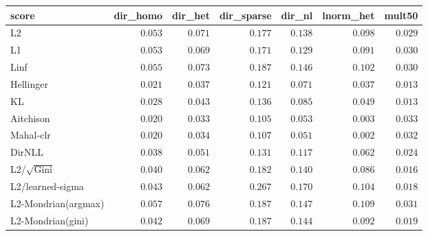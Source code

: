 \begin{tabular}{lrrrrrr}
\toprule
score & dir\_homo & dir\_het & dir\_sparse & dir\_nl & lnorm\_het & mult50 \\
\midrule
L2 & $0.053$ & $0.071$ & $0.177$ & $0.138$ & $0.098$ & $0.029$ \\
L1 & $0.053$ & $0.069$ & $0.171$ & $0.129$ & $0.091$ & $0.030$ \\
Linf & $0.055$ & $0.073$ & $0.187$ & $0.146$ & $0.102$ & $0.030$ \\
Hellinger & $0.021$ & $0.037$ & $0.121$ & $0.071$ & $0.037$ & $0.013$ \\
KL & $0.028$ & $0.043$ & $0.136$ & $0.085$ & $0.049$ & $\mathbf{0.013}$ \\
Aitchison & $0.020$ & $\mathbf{0.033}$ & $\mathbf{0.105}$ & $0.053$ & $0.003$ & $0.033$ \\
Mahal-clr & $\mathbf{0.020}$ & $0.034$ & $0.107$ & $\mathbf{0.051}$ & $\mathbf{0.002}$ & $0.032$ \\
DirNLL & $0.038$ & $0.051$ & $0.131$ & $0.117$ & $0.062$ & $0.024$ \\
L2/$\sqrt{\mathrm{Gini}}$ & $0.040$ & $0.062$ & $0.182$ & $0.140$ & $0.086$ & $0.016$ \\
L2/learned-sigma & $0.043$ & $0.062$ & $0.267$ & $0.170$ & $0.104$ & $0.018$ \\
L2-Mondrian(argmax) & $0.057$ & $0.076$ & $0.187$ & $0.147$ & $0.109$ & $0.031$ \\
L2-Mondrian(gini) & $0.042$ & $0.069$ & $0.187$ & $0.144$ & $0.092$ & $0.019$ \\
\bottomrule
\end{tabular}